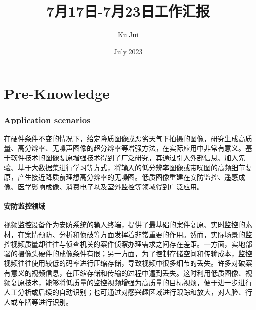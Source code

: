 \documentclass[letterpaper,10pt]{article}
\begin{document}
	
	
	\title{\songti {}7月17日-7月23日工作汇报}
	\author{\textrm{Ku Jui}}
	\date{\textrm{July 2023}}
	\maketitle
	
	\renewcommand{\figurename}{Figure} %
	\renewcommand{\contentsname}{Contents}
	\renewcommand{\tablename}{Table}
	\tableofcontents  %
	
	\part{Pre-Knowledge}
	
	\section{Application scenarios}
	
	在硬件条件不变的情况下，给定降质图像或恶劣天气下拍摄的图像，研究生成高质量、高分辨率、无噪声图像的超分辨率等增强方法，在实际应用中非常有意义。基于软件技术的图像复原增强技术得到了广泛研究，其通过引入外部信息、加入先验、基于大数据集进行学习等方式，将输入的低分辨率图像或带噪图的高频细节复原，产生接近降质前理想高分辨率的无噪图。低质图像重建在安防监控、遥感成像、医学影响成像、消费电子以及室外监控等领域得到广泛应用。
	
		\subsection{安防监控领域}
		
		视频监控设备作为安防系统的输人终端，提供了最基础的案件复原、实时监控的素材，在案情预防、分析和侦破等方面发挥着非常重要的作用。然而，实际场景的监控视频质量却往往与侦查机关的案件侦察办理需求之间存在差距。一方面，实地部署的摄像头硬件的成像条件有限；另一方面，为了控制存储空间和传输成本，监控视频往往使用较低的码率进行压缩存储，导致视频中很多细节的丢失。许多对破案有意义的视频信息，在压缩存储和传输的过程中遭到丢失。这时利用低质图像、视频复原技术，能够将低质量的监控视频增强为高质量的目标视烦，便于进一步进行人工分析或后续的自动识别；也可通过对感兴趣区域进行跟踪和放大，对人脸、行人或车牌等进行识别。
		
\end{document}
